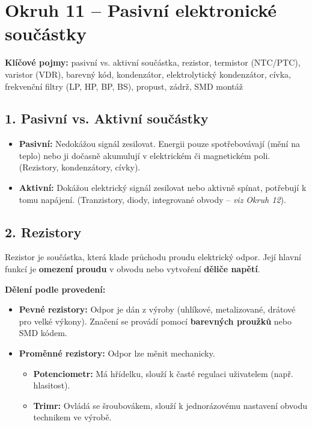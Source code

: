 \documentclass[a4paper,10pt]{article}
\begin{document}
\section*{\large Okruh 11 – Pasivní elektronické součástky}

\begin{pojmybox}
\textbf{Klíčové pojmy:}
pasivní vs. aktivní součástka, rezistor, termistor (NTC/PTC), varistor (VDR), barevný kód, kondenzátor, elektrolytický kondenzátor, cívka, frekvenční filtry (LP, HP, BP, BS), propust, zádrž, SMD montáž
\end{pojmybox}

\begin{vysvetlenibox}

\subsection*{1. Pasivní vs. Aktivní součástky}

\begin{itemize}
    \item \textbf{Pasivní:} Nedokážou signál zesilovat. Energii pouze spotřebovávají (mění na teplo) nebo ji dočasně akumulují v elektrickém či magnetickém poli. (Rezistory, kondenzátory, cívky).
    \item \textbf{Aktivní:} Dokážou elektrický signál zesilovat nebo aktivně spínat, potřebují k tomu napájení. (Tranzistory, diody, integrované obvody – \textit{viz Okruh 12}).
\end{itemize}

\subsection*{2. Rezistory}

Rezistor je součástka, která klade průchodu proudu elektrický odpor. Její hlavní funkcí je \textbf{omezení proudu} v obvodu nebo vytvoření \textbf{děliče napětí}.

\textbf{Dělení podle provedení:}
\begin{itemize}
    \item \textbf{Pevné rezistory:} Odpor je dán z výroby (uhlíkové, metalizované, drátové pro velké výkony). Značení se provádí pomocí \textbf{barevných proužků} nebo SMD kódem.
    \item \textbf{Proměnné rezistory:} Odpor lze měnit mechanicky.
    \begin{itemize}
        \item \textbf{Potenciometr:} Má hřídelku, slouží k časté regulaci uživatelem (např. hlasitost).
        \item \textbf{Trimr:} Ovládá se šroubovákem, slouží k jednorázovému nastavení obvodu technikem ve výrobě.
    \end{itemize}
\end{itemize}


\end{vysvetlenibox}
\end{document}
